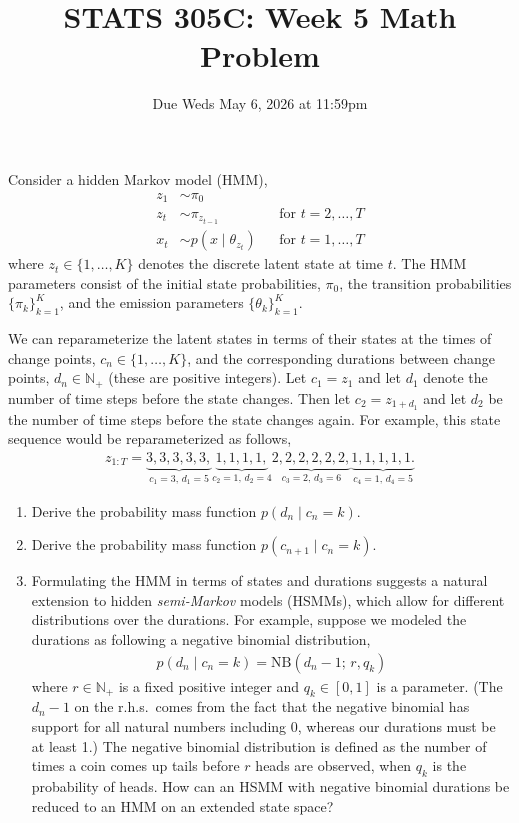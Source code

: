 \documentclass[11pt]{article}
\title{STATS 305C: Week 5 Math Problem}
\date{Due Weds May 6, 2026 at 11:59pm}
\begin{document}
\maketitle
\noindent

Consider a hidden Markov model (HMM),
\begin{align*}
    z_1 &\sim \pi_0 \\
    z_t &\sim \pi_{z_{t-1}} && \text{for } t = 2, \ldots, T \\
    x_t &\sim p(x \mid \theta_{z_t}) && \text{for } t = 1, \ldots, T
\end{align*}
where $z_t \in \{1, \ldots, K\}$ denotes the discrete latent state at time $t$. The HMM
parameters consist of the initial state probabilities, $\pi_0$, the transition probabilities
$\{\pi_k\}_{k=1}^K$, and the emission parameters $\{\theta_k\}_{k=1}^K$.

\bigskip
\noindent
We can reparameterize the latent states in terms of their states at the times of change
points, $c_n \in \{1, \ldots, K\}$, and the corresponding durations between change points,
$d_n \in \mathbb{N}_+$ (these are positive integers). Let $c_1 = z_1$ and let $d_1$ denote
the number of time steps before the state changes. Then let $c_2 = z_{1+d_1}$ and let $d_2$
be the number of time steps before the state changes again. For example, this state sequence
would be reparameterized as follows,
\begin{align*}
    z_{1:T} = \underbrace{3, 3, 3, 3, 3,}_{c_1=3,\, d_1=5}
              \underbrace{1, 1, 1, 1,}_{c_2=1,\, d_2=4}
              \underbrace{2, 2, 2, 2, 2, 2,}_{c_3=2,\, d_3=6}
              \underbrace{1, 1, 1, 1, 1.}_{c_4=1,\, d_4=5}
\end{align*}

\begin{enumerate}[label=(\alph*)]
    \item Derive the probability mass function $p(d_n \mid c_n = k)$.

    \item Derive the probability mass function $p(c_{n+1} \mid c_n = k)$.

    \item Formulating the HMM in terms of states and durations suggests a natural extension
    to hidden \textit{semi-Markov} models (HSMMs), which allow for different distributions
    over the durations. For example, suppose we modeled the durations as following a negative
    binomial distribution,
    \begin{align*}
        p(d_n \mid c_n = k) = \mathrm{NB}(d_n - 1;\, r, q_k)
    \end{align*}
    where $r \in \mathbb{N}_+$ is a fixed positive integer and $q_k \in [0, 1]$ is a
    parameter. (The $d_n - 1$ on the r.h.s.\ comes from the fact that the negative binomial
    has support for all natural numbers including 0, whereas our durations must be at least
    1.) The negative binomial distribution is defined as the number of times a coin comes up
    tails before $r$ heads are observed, when $q_k$ is the probability of heads. How can an
    HSMM with negative binomial durations be reduced to an HMM on an extended state space?
\end{enumerate}
\end{document}
